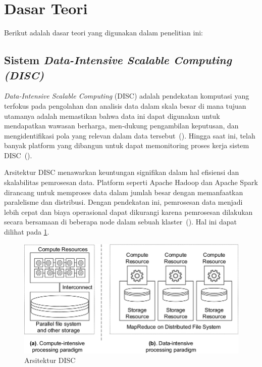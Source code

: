 \section{Dasar Teori}
\label{sec:dasarTeori}

Berikut adalah dasar teori yang digunakan dalam penelitian ini:

\subsection{Sistem \emph{Data-Intensive Scalable Computing (DISC)}}

\emph{Data-Intensive Scalable Computing} (DISC) adalah pendekatan
komputasi yang terfokus pada pengolahan dan analisis data dalam
skala besar di mana tujuan utamanya adalah memastikan bahwa data
ini dapat digunakan untuk mendapatkan wawasan berharga, men-dukung
pengambilan keputusan, dan mengidentifikasi pola yang relevan
dalam data tersebut~(\cite{dantas2020}). Hingga saat ini, telah
banyak platform yang dibangun untuk dapat memonitoring proses
kerja sistem DISC~(\cite{dragan2019}). 

Arsitektur DISC menawarkan keuntungan signifikan dalam hal efisiensi dan skalabilitas pemrosesan data. Platform seperti Apache Hadoop dan Apache Spark dirancang untuk memproses data dalam jumlah besar dengan memanfaatkan paralelisme dan distribusi. Dengan pendekatan ini, pemrosesan data menjadi lebih cepat dan biaya operasional dapat dikurangi karena pemrosesan dilakukan secara bersamaan di beberapa node dalam sebuah klaster~(\cite{dean2008}).
Hal ini dapat dilihat pada \ref{fig:DISCArchitecture}.

\begin{figure}[H]
  \centering
  \includegraphics[scale=0.5]{gambar/DISCArchitecture.png}
  \caption{Arsitektur DISC}
  \label{fig:DISCArchitecture}
\end{figure}

